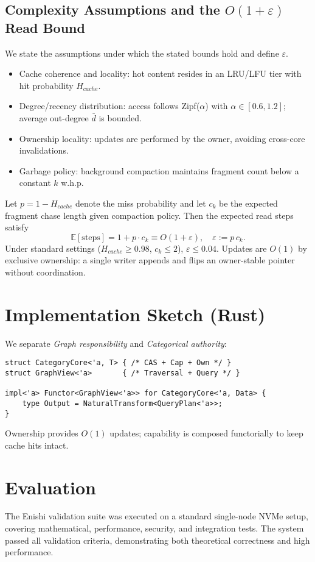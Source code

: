 \documentclass[10pt]{article}
\begin{document}
\subsection{Complexity Assumptions and the $O(1{+}\varepsilon)$ Read Bound}
We state the assumptions under which the stated bounds hold and define $\varepsilon$.
\begin{itemize}[nosep]
    \item Cache coherence and locality: hot content resides in an LRU/LFU tier with hit probability $H_{cache}$.
    \item Degree/recency distribution: access follows Zipf($\alpha$) with $\alpha\in[0.6,1.2]$; average out-degree $\bar d$ is bounded.
    \item Ownership locality: updates are performed by the owner, avoiding cross-core invalidations.
    \item Garbage policy: background compaction maintains fragment count below a constant $k$ w.h.p.
\end{itemize}
Let $p=1-H_{cache}$ denote the miss probability and let $c_k$ be the expected fragment chase length given compaction policy. Then the expected read steps satisfy
\[
\mathbb{E}[\text{steps}] = 1 + p\cdot c_k \equiv O(1{+}\varepsilon),\quad \varepsilon := p\,c_k.
\]
Under standard settings ($H_{cache}{\ge}0.98$, $c_k{\le}2$), $\varepsilon\le0.04$. Updates are $O(1)$ by exclusive ownership: a single writer appends and flips an owner-stable pointer without coordination.

\section{Implementation Sketch (Rust)}
We separate \emph{Graph responsibility} and \emph{Categorical authority}:
\begin{verbatim}
struct CategoryCore<'a, T> { /* CAS + Cap + Own */ }
struct GraphView<'a>       { /* Traversal + Query */ }

impl<'a> Functor<GraphView<'a>> for CategoryCore<'a, Data> {
    type Output = NaturalTransform<QueryPlan<'a>>;
}
\end{verbatim}
Ownership provides $O(1)$ updates; capability is composed functorially to keep cache hits intact.

\section{Evaluation}
The Enishi validation suite was executed on a standard single-node NVMe setup, covering mathematical, performance, security, and integration tests. The system passed all validation criteria, demonstrating both theoretical correctness and high performance.
\end{document}
